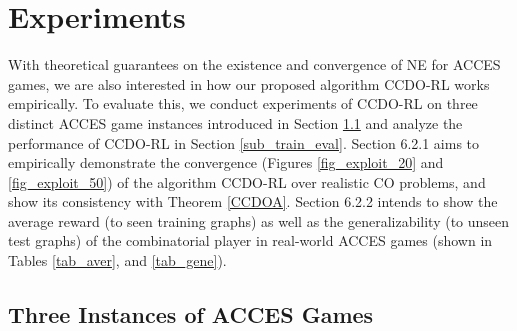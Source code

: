 \section{Experiments}\label{sec_exp}




With theoretical guarantees on the existence and convergence of NE for ACCES games, we are also interested in how our proposed algorithm CCDO-RL works empirically. To evaluate this, we conduct experiments of CCDO-RL on three distinct ACCES game instances introduced in Section \ref{sub_exp_ins} and analyze the performance of CCDO-RL in Section \ref{sub_train_eval}. Section 6.2.1 aims to empirically demonstrate the convergence (Figures \ref{fig_exploit_20} and \ref{fig_exploit_50}) of the algorithm CCDO-RL over realistic CO problems, and show its consistency with Theorem \ref{CCDOA}. Section 6.2.2 intends to show the average reward (to seen training graphs) as well as the generalizability (to unseen test graphs) of the combinatorial player in real-world ACCES games (shown in Tables \ref{tab_aver}, and \ref{tab_gene}).

\subsection{Three Instances of ACCES Games} \label{sub_exp_ins}


